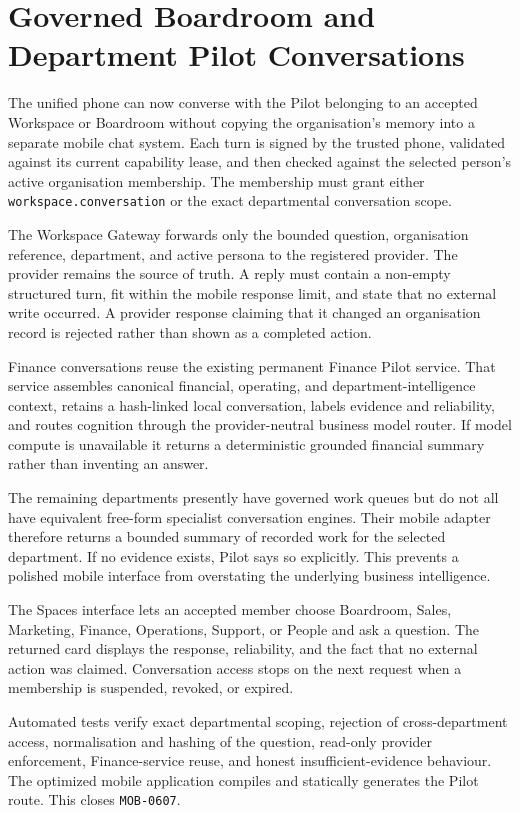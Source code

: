 \section{Governed Boardroom and Department Pilot Conversations}
\label{sec:pilot-mobile-boardroom-conversations}
\raggedright

The unified phone can now converse with the Pilot belonging to an accepted Workspace or
Boardroom without copying the organisation's memory into a separate mobile chat system.  Each
turn is signed by the trusted phone, validated against its current capability lease, and then
checked against the selected person's active organisation membership.  The membership must
grant either \texttt{workspace.conversation} or the exact departmental conversation scope.

The Workspace Gateway forwards only the bounded question, organisation reference, department,
and active persona to the registered provider.  The provider remains the source of truth.  A
reply must contain a non-empty structured turn, fit within the mobile response limit, and state
that no external write occurred.  A provider response claiming that it changed an organisation
record is rejected rather than shown as a completed action.

Finance conversations reuse the existing permanent Finance Pilot service.  That service assembles
canonical financial, operating, and department-intelligence context, retains a hash-linked local
conversation, labels evidence and reliability, and routes cognition through the provider-neutral
business model router.  If model compute is unavailable it returns a deterministic grounded
financial summary rather than inventing an answer.

The remaining departments presently have governed work queues but do not all have equivalent
free-form specialist conversation engines.  Their mobile adapter therefore returns a bounded
summary of recorded work for the selected department.  If no evidence exists, Pilot says so
explicitly.  This prevents a polished mobile interface from overstating the underlying business
intelligence.

The Spaces interface lets an accepted member choose Boardroom, Sales, Marketing, Finance,
Operations, Support, or People and ask a question.  The returned card displays the response,
reliability, and the fact that no external action was claimed.  Conversation access stops on the
next request when a membership is suspended, revoked, or expired.

Automated tests verify exact departmental scoping, rejection of cross-department access,
normalisation and hashing of the question, read-only provider enforcement, Finance-service reuse,
and honest insufficient-evidence behaviour.  The optimized mobile application compiles and
statically generates the Pilot route.  This closes \texttt{MOB-0607}.
